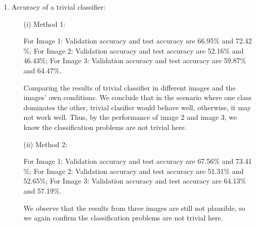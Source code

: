 \documentclass[11pt]{article}
\begin{document}
\begin{enumerate}[label=(\alph*)]
\item Accuracy of a trivial classifier:
\begin{enumerate}
\item[(i)] Method 1:

\quad For Image 1: Validation accuracy and test accuracy are 66.95$\%$ and 72.42$\%$; For Image 2: Validation accuracy and test accuracy are 52.16$\%$ and 46.43$\%$; For Image 3: Validation accuracy and test accuracy are 59.87$\%$ and 64.47$\%$.\par
\quad Comparing the results of trivial classifier in different images and the images' own conditions. We conclude that in the scenario where one class dominates the other, trivial clasifier would behave well, otherwise, it may not work well. Thus, by the performance of image 2 and image 3, we know the classification problems are not trivial here.

\item[(ii)]  Method 2:

\quad For Image 1: Validation accuracy and test accuracy are 67.56$\%$ and 73.41$\%$; For Image 2: Validation accuracy and test accuracy are 51.31$\%$ and 52.65$\%$; For Image 3: Validation accuracy and test accuracy are 64.13$\%$ and 57.19$\%$.\par
\quad We observe that the results from three images are still not plausible, so we again confirm the classification problems are not trivial here.
\end{enumerate}


\end{enumerate}
\end{document}
